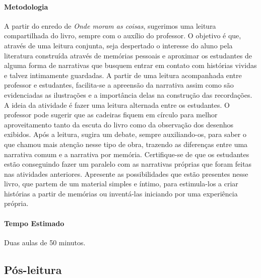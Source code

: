 \documentclass[11pt]{extarticle}
\begin{document}
\paragraph{Metodologia}

A partir do enredo de \textit{Onde moram as coisas}, sugerimos uma leitura compartilhada do livro, sempre com o auxílio do professor. O objetivo é que, através de uma leitura conjunta, seja despertado o interesse do aluno pela literatura construída através de memórias pessoais e aproximar os estudantes de alguma forma de narrativas que busquem entrar em contato com histórias vividas e talvez intimamente guardadas. A partir de uma leitura acompanhada entre professor e estudantes, facilita-se a apreensão da narrativa assim como são evidenciadas as ilustrações e a importância delas na construção das recordações. A ideia da atividade é fazer uma leitura alternada entre os estudantes. O professor pode sugerir que as cadeiras fiquem em círculo para melhor aproveitamento tanto da escuta do livro como da observação dos desenhos exibidos. Após a leitura, sugira um debate, sempre auxiliando-os, para saber o que chamou mais atenção nesse tipo de obra, trazendo as diferenças entre uma narrativa comum e a narrativa por memória. Certifique-se de que os estudantes estão conseguindo fazer um paralelo com as narrativas próprias que foram feitas nas atividades anteriores. Apresente as possibilidades que estão presentes nesse livro, que partem de um material simples e íntimo, para estimula-los a criar histórias a partir de memórias ou inventá-las iniciando por uma experiência própria.


\paragraph{Tempo Estimado} Duas aulas de 50 minutos. 

\subsection{Pós-leitura} 

\end{document}
